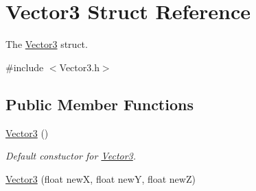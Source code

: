 \hypertarget{struct_vector3}{\section{Vector3 Struct Reference}
\label{struct_vector3}
}


The \hyperlink{struct_vector3}{Vector3} struct.  




{\ttfamily \#include $<$Vector3.\-h$>$}

\subsection*{Public Member Functions}
\begin{DoxyCompactItemize}
\item 
\hypertarget{struct_vector3_a0f49191f7e001e7f7ae1cb49522118b4}{\hyperlink{struct_vector3_a0f49191f7e001e7f7ae1cb49522118b4}{Vector3} ()}\label{struct_vector3_a0f49191f7e001e7f7ae1cb49522118b4}

\begin{DoxyCompactList}\small\item\em Default constuctor for \hyperlink{struct_vector3}{Vector3}. \end{DoxyCompactList}\item 
\hypertarget{struct_vector3_ac599dbf981021aed3af55e48b17a20de}{\hyperlink{struct_vector3_ac599dbf981021aed3af55e48b17a20de}{Vector3} (float new\-X, float new\-Y, float new\-Z)}\label{struct_vector3_ac599dbf981021aed3af55e48b17a20de}


\end{DoxyCompactItemize}
